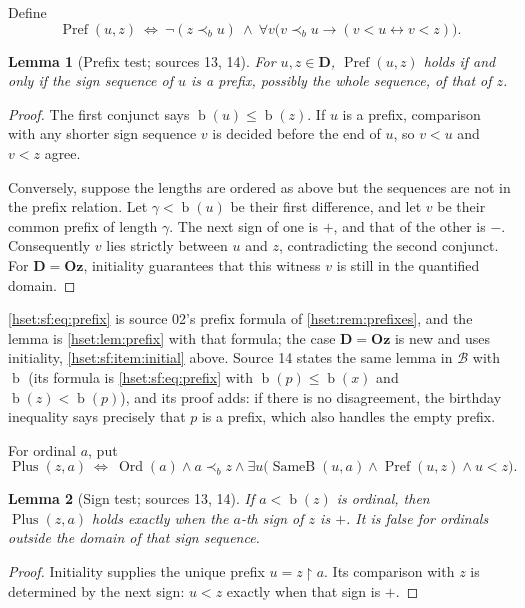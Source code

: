 \documentclass[11pt,letterpaper]{article}
\newtheorem{lemma}[lemma]{Lemma}\aliascntresetthe{lemma}
\theoremstyle{definition}
\theoremstyle{remark}
\newcommand{\Ord}{\operatorname{Ord}}
\newcommand{\bd}{\operatorname{b}}
\newcommand{\B}{\mathcal B}
\newcommand{\restr}{\mathbin{\upharpoonright}}
\newcommand{\Oz}{\mathbf{Oz}}
\newcommand{\precb}{\prec_b}
\newcommand{\EqB}{\operatorname{SameB}}
\newcommand{\Prefp}{\operatorname{Pref}}
\newcommand{\Plusp}{\operatorname{Plus}}
\newcommand{\Dd}{\mathbf{D}}
\begin{document}
Define
\begin{equation}\label{hset:sf:eq:prefix}
 \Prefp(u,z)\ \Longleftrightarrow\ \neg(z\precb u)\ \land\
 \forall v\bigl(v\precb u\longrightarrow(v<u\longleftrightarrow v<z)\bigr).
\end{equation}

\begin{lemma}[Prefix test; sources 13, 14]\label{hset:sf:lem:prefix}
For $u,z\in\Dd$, $\Prefp(u,z)$ holds if and only if the sign sequence of $u$ is
a prefix, possibly the whole sequence, of that of $z$.
\end{lemma}
\begin{proof}
The first conjunct says $\bd(u)\le\bd(z)$. If $u$ is a prefix, comparison with
any shorter sign sequence $v$ is decided before the end of $u$, so $v<u$ and
$v<z$ agree.

Conversely, suppose the lengths are ordered as above but the sequences are not in
the prefix relation. Let $\gamma<\bd(u)$ be their first difference, and let $v$ be
their common prefix of length $\gamma$. The next sign of one is $+$, and that of
the other is $-$. Consequently $v$ lies strictly between $u$ and $z$,
contradicting the second conjunct. For $\Dd=\Oz$, initiality guarantees that this
witness $v$ is still in the quantified domain.
\end{proof}

\eqref{hset:sf:eq:prefix} is source 02's prefix formula of
\cref{hset:rem:prefixes}, and the lemma is \cref{hset:lem:prefix} with that
formula; the case $\Dd=\Oz$ is new and uses initiality,
\ref{hset:sf:item:initial} above. Source 14 states the same lemma in $\B$ with
$\bd$ (its formula is \eqref{hset:sf:eq:prefix} with $\bd(p)\le\bd(x)$ and
$\bd(z)<\bd(p)$), and its proof adds: if there is no disagreement, the birthday
inequality says precisely that $p$ is a prefix, which also handles the empty
prefix.

For ordinal $a$, put
\begin{equation}\label{hset:sf:eq:plus}
 \Plusp(z,a)\ \Longleftrightarrow\ \Ord(a)\land a\precb z\land
 \exists u\bigl(\EqB(u,a)\land\Prefp(u,z)\land u<z\bigr).
\end{equation}

\begin{lemma}[Sign test; sources 13, 14]\label{hset:sf:lem:sign}
If $a<\bd(z)$ is ordinal, then $\Plusp(z,a)$ holds exactly when the $a$-th sign
of $z$ is $+$. It is false for ordinals outside the domain of that sign sequence.
\end{lemma}
\begin{proof}
Initiality supplies the unique prefix $u=z\restr a$. Its comparison with $z$ is
determined by the next sign: $u<z$ exactly when that sign is $+$.
\end{proof}
\end{document}
